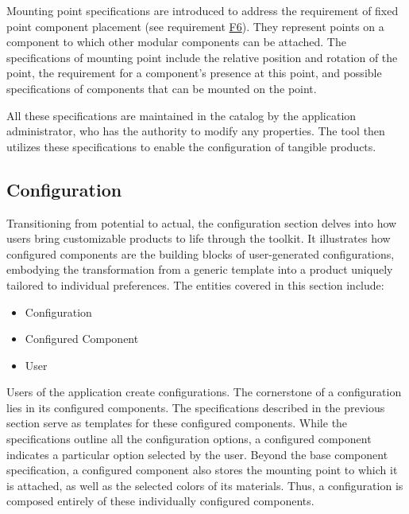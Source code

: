 Mounting point specifications are introduced to address the requirement of fixed point component placement (see requirement \hyperref[itm:F6]{F6}). They represent points on a component to which other modular components can be attached. The specifications of mounting point include the relative position and rotation of the point, the requirement for a component's presence at this point, and possible specifications of components that can be mounted on the point.

All these specifications are maintained in the catalog by the application administrator, who has the authority to modify any properties. The tool then utilizes these specifications to enable the configuration of tangible products.


\subsection{Configuration}

Transitioning from potential to actual, the configuration section delves into how users bring customizable products to life through the toolkit.
It illustrates how configured components are the building blocks of user-generated configurations, embodying the transformation from a generic template into a product uniquely tailored to individual preferences.
The entities covered in this section include:
\begin{itemize}
    \item Configuration
    \item Configured Component
    \item User
\end{itemize}

Users of the application create configurations. The cornerstone of a configuration lies in its configured components. The specifications described in the previous section serve as templates for these configured components. While the specifications outline all the configuration options, a configured component indicates a particular option selected by the user. Beyond the base component specification, a configured component also stores the mounting point to which it is attached, as well as the selected colors of its materials. Thus, a configuration is composed entirely of these individually configured components.


